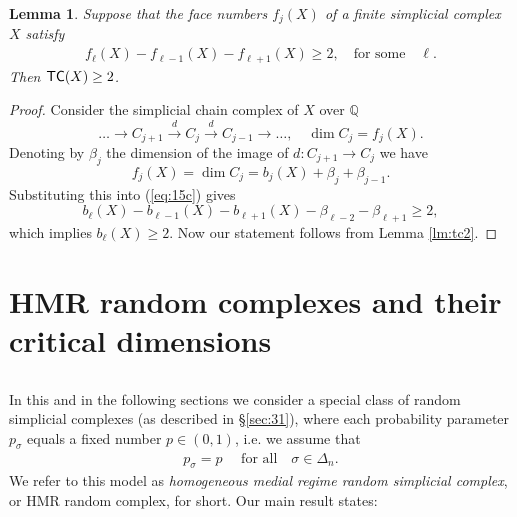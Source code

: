 \documentclass[10pt,a4paper]{amsart}
\newtheorem{lema}{Lemma}
\newtheorem{corollary}[lema]{Corollary}
\newcommand{\TC}{\textrm{TC}}
\newcommand{\tc}{{\sf{TC}}}
\begin{document}
\begin{lema}\label{lm:tc22}
Suppose that the face numbers $f_j(X)$ of  a finite simplicial complex $X$ satisfy 
\begin{eqnarray}\label{eq:15c}
f_{\ell}(X)-f_{\ell-1}(X)-f_{\ell+1}(X)\ge 2,\quad \mbox{for some}\quad \ell.
\end{eqnarray}   
Then $\tc(X)\ge 2$. 
\end{lema}
\begin{proof} Consider the simplicial chain complex of $X$ over $\mathbb Q$
$$
\dots\to C_{j+1}\stackrel d\to C_j\stackrel d\to C_{j-1}\to \dots, \quad \dim C_j=f_j(X).
$$
Denoting by $\beta_j$ the dimension of the image of $d:C_{j+1}\to C_j$ we have 
$$
f_j(X) = \dim C_j=b_j(X)+\beta_j +\beta_{j-1}.
$$
Substituting this into  (\ref{eq:15c}) gives
$$
b_\ell(X) -b_{\ell-1}(X)-b_{\ell+1}(X)-\beta_{\ell-2}-\beta_{\ell+1}\ge 2,
$$
which implies  $b_\ell(X)\ge 2.$ Now our statement follows from Lemma \ref{lm:tc2}. 
\end{proof}


%
%

\section{HMR random complexes and their critical dimensions}\label{sec:hmr}
\subsection{} In this and in the following sections we consider a special class of random simplicial complexes (as described in \S\ref{sec:31}), where each probability parameter $p_\sigma$ equals a fixed number 
$p\in (0,1)$, i.e. 
we assume that 
\begin{eqnarray*}
p_\sigma=p\quad \mbox{ for all}\quad  \sigma\in \Delta_n.
\end{eqnarray*} 
We refer to this model as {\it homogeneous medial regime random simplicial complex}, or HMR random complex, for short.
Our main result states: 
\end{document}
